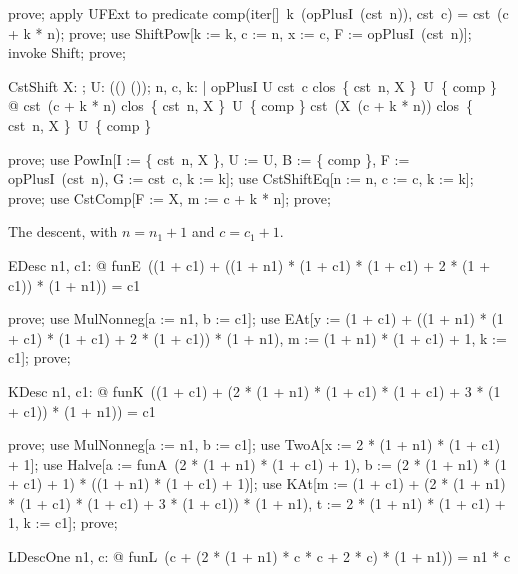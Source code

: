 \documentclass{article}
\begin{document}
\begin{zproof}
prove;
apply UFExt to predicate comp(iter[\nat]~k~(opPlusI~(cst~n)), cst~c) = cst~(c + k * n);
prove;
use ShiftPow[k := k, c := n, x := c, F := opPlusI~(cst~n)];
invoke Shift;
prove;
\end{zproof}

\begin{theorem}{CstShift}
  \forall X: \nat \fun \nat; U: \power ((\nat \fun \nat) \fun (\nat \fun \nat)); n, c, k: \nat | opPlusI \in U \land cst~c \in clos~\{ cst~n, X \}~U~\{ comp \} @ cst~(c + k * n) \in clos~\{ cst~n, X \}~U~\{ comp \} \land cst~(X~(c + k * n)) \in clos~\{ cst~n, X \}~U~\{ comp \}
\end{theorem}

\begin{zproof}
prove;
use PowIn[I := \{ cst~n, X \}, U := U, B := \{ comp \}, F := opPlusI~(cst~n), G := cst~c, k := k];
use CstShiftEq[n := n, c := c, k := k];
prove;
use CstComp[F := X, m := c + k * n];
prove;
\end{zproof}

The descent, with $n = n_1 + 1$ and $c = c_1 + 1$.

\begin{theorem}{EDesc}
  \forall n1, c1: \nat @ funE~((1 + c1) + ((1 + n1) * (1 + c1) * (1 + c1) + 2 * (1 + c1)) * (1 + n1)) = c1
\end{theorem}

\begin{zproof}
prove;
use MulNonneg[a := n1, b := c1];
use EAt[y := (1 + c1) + ((1 + n1) * (1 + c1) * (1 + c1) + 2 * (1 + c1)) * (1 + n1), m := (1 + n1) * (1 + c1) + 1, k := c1];
prove;
\end{zproof}

\begin{theorem}{KDesc}
  \forall n1, c1: \nat @ funK~((1 + c1) + (2 * (1 + n1) * (1 + c1) * (1 + c1) + 3 * (1 + c1)) * (1 + n1)) = c1
\end{theorem}

\begin{zproof}
prove;
use MulNonneg[a := n1, b := c1];
use TwoA[x := 2 * (1 + n1) * (1 + c1) + 1];
use Halve[a := funA~(2 * (1 + n1) * (1 + c1) + 1), b := (2 * (1 + n1) * (1 + c1) + 1) * ((1 + n1) * (1 + c1) + 1)];
use KAt[m := (1 + c1) + (2 * (1 + n1) * (1 + c1) * (1 + c1) + 3 * (1 + c1)) * (1 + n1), t := 2 * (1 + n1) * (1 + c1) + 1, k := c1];
prove;
\end{zproof}

\begin{theorem}{LDescOne}
  \forall n1, c: \nat @ funL~(c + (2 * (1 + n1) * c * c + 2 * c) * (1 + n1)) = n1 * c
\end{theorem}
\end{document}
